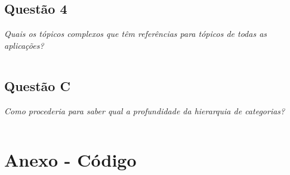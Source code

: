\documentclass[a4paper,12pt]{article}
\begin{document}
	\inputminted{sql}{3.sql}

\subsection{Questão 4}

	\emph{Quais os tópicos complexos que têm referências para tópicos de todas as aplicações?}\\

	\inputminted{sql}{4.sql}

\subsection{Questão C}

	\emph{Como procederia para saber qual a profundidade da hierarquia de categorias?}\\

	\inputminted{sql}{C.sql}


\newpage 
\section{Anexo - Código}


	\inputminted{sql}{sql3.sql}
\end{document}
